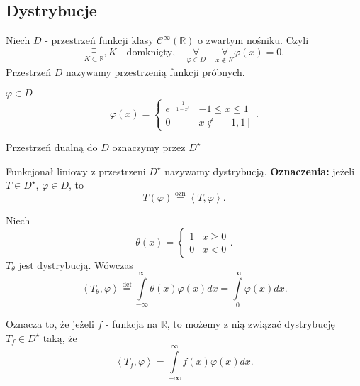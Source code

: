 \documentclass[../main.tex]{subfiles}
\begin{document}
\subsection{Dystrybucje}
    \begin{definicja}
        Niech $D$ - przestrzeń funkcji klasy $\mathcal{C}^\infty(\mathbb{R})$ o zwartym nośniku. Czyli
        \[
            \underset{K\subset\mathbb{R}}{\exists} ,\text{$K$ - domknięty},\quad \underset{\varphi\in D}{\forall} \quad \underset{x\not\in K}{\forall} \varphi(x) = 0
        .\]
    Przestrzeń $D$ nazywamy przestrzenią funkcji próbnych.
    \end{definicja}
    \begin{przyklad}
        $\varphi\in D$
        \[
            \varphi(x) = \begin{cases}
                e^{-\frac{1}{1-x^2}}&-1\le x \le 1\\
                0 & x\not\in[-1,1]
            \end{cases}
        .\]
    \end{przyklad}
    Przestrzeń dualną do $D$ oznaczymy przez $D^\star$
     \begin{definicja}
        Funkcjonał liniowy z przestrzeni $D^\star$ nazywamy dystrybucją.
        \textbf{Oznaczenia:} jeżeli $T\in D^\star$, $\varphi\in D$, to
         \[
             T(\varphi) \overset{\text{ozn}}{=} \left<T, \varphi \right>
         .\]
    \end{definicja}
    \begin{przyklad}
        Niech
        \[
            \theta(x) = \begin{cases}
                1 & x \ge 0\\
                0 & x < 0
            \end{cases}
        .\]
    $T_\theta$ jest dystrybucją. Wówczas
        \[
            \left<T_\theta, \varphi \right> \overset{\text{def}}{=} \int\limits_{-\infty}^{\infty} \theta(x)\varphi(x)dx = \int\limits_{0}^{\infty} \varphi(x)dx
        .\]
    \end{przyklad}
    Oznacza to, że jeżeli $f$ - funkcja na $\mathbb{R}$, to możemy z nią związać dystrybucję $T_f\in D^\star$ taką, że
    \[
        \left<T_f, \varphi \right> = \int\limits_{-\infty}^{\infty} f(x)\varphi(x)dx
    .\]
\end{document}
